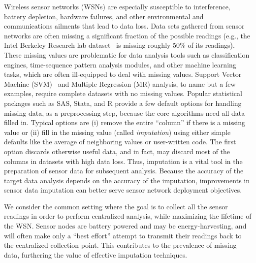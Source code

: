 
Wireless sensor networks (WSNs) are especially susceptible to interference,
battery depletion, hardware failures, and other environmental and communications ailments
that lead to data loss.  Data sets gathered from sensor networks are
often missing a significant fraction of the possible readings
(e.g., the Intel Berkeley Research lab dataset~\cite{berkeley2004lab}
is missing roughly 50\% of its readings).
These missing values are problematic for data analysis tools such as
classification engines, time-sequence pattern analysis modules, and
other machine learning tasks, which are often ill-equipped to deal
with missing values.  Support Vector Machine
(SVM)~\cite{vapnik2000nature} and Multiple Regression (MR) analysis,
to name but a few examples, require complete datasets with no missing
values.  Popular statistical packages such as SAS, Stata, and R
provide a few default options for handling missing data, as a
preprocessing step, because the core algorithms need all data filled
in.  Typical options are (i) remove the entire ``column'' if there is a
missing value or (ii) fill in the missing value (called {\em
imputation}) using either simple defaults like the average of
neighboring values or user-written code.  The first option discards
otherwise useful data, and in fact, may discard most of the columns in
datasets with high data loss.  Thus, imputation is a vital tool in the
preparation of sensor data for subsequent analysis. Because the
accuracy of the target data analysis depends on the accuracy of the
imputation, improvements in sensor data imputation can better serve
sensor network deployment objectives.

We consider the common setting where the goal is to collect all the sensor readings
in order to perform centralized analysis, while maximizing the lifetime of the WSN.
Sensor nodes are battery powered and may be energy-harvesting, and will often make
only a ``best effort'' attempt to transmit their readings back to the centralized 
collection point.  This contributes to the prevalence of missing data, furthering
the value of effective imputation techniques.

